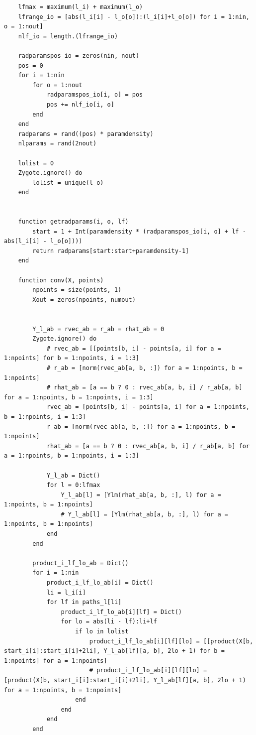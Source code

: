 \documentclass[book.tex]{subfiles}
\begin{document}
\begin{lstlisting}
    lfmax = maximum(l_i) + maximum(l_o)
    lfrange_io = [abs(l_i[i] - l_o[o]):(l_i[i]+l_o[o]) for i = 1:nin, o = 1:nout]
    nlf_io = length.(lfrange_io)

    radparamspos_io = zeros(nin, nout)
    pos = 0
    for i = 1:nin
        for o = 1:nout
            radparamspos_io[i, o] = pos
            pos += nlf_io[i, o]
        end
    end
    radparams = rand((pos) * paramdensity)
    nlparams = rand(2nout)

    lolist = 0
    Zygote.ignore() do
        lolist = unique(l_o)
    end


    function getradparams(i, o, lf)
        start = 1 + Int(paramdensity * (radparamspos_io[i, o] + lf - abs(l_i[i] - l_o[o])))
        return radparams[start:start+paramdensity-1]
    end

    function conv(X, points)
        npoints = size(points, 1)
        Xout = zeros(npoints, numout)


        Y_l_ab = rvec_ab = r_ab = rhat_ab = 0
        Zygote.ignore() do
            # rvec_ab = [[points[b, i] - points[a, i] for a = 1:npoints] for b = 1:npoints, i = 1:3]
            # r_ab = [norm(rvec_ab[a, b, :]) for a = 1:npoints, b = 1:npoints]
            # rhat_ab = [a == b ? 0 : rvec_ab[a, b, i] / r_ab[a, b] for a = 1:npoints, b = 1:npoints, i = 1:3]
            rvec_ab = [points[b, i] - points[a, i] for a = 1:npoints, b = 1:npoints, i = 1:3]
            r_ab = [norm(rvec_ab[a, b, :]) for a = 1:npoints, b = 1:npoints]
            rhat_ab = [a == b ? 0 : rvec_ab[a, b, i] / r_ab[a, b] for a = 1:npoints, b = 1:npoints, i = 1:3]

            Y_l_ab = Dict()
            for l = 0:lfmax
                Y_l_ab[l] = [Ylm(rhat_ab[a, b, :], l) for a = 1:npoints, b = 1:npoints]
                # Y_l_ab[l] = [Ylm(rhat_ab[a, b, :], l) for a = 1:npoints, b = 1:npoints]
            end
        end

        product_i_lf_lo_ab = Dict()
        for i = 1:nin
            product_i_lf_lo_ab[i] = Dict()
            li = l_i[i]
            for lf in paths_l[li]
                product_i_lf_lo_ab[i][lf] = Dict()
                for lo = abs(li - lf):li+lf
                    if lo in lolist
                        product_i_lf_lo_ab[i][lf][lo] = [[product(X[b, start_i[i]:start_i[i]+2li], Y_l_ab[lf][a, b], 2lo + 1) for b = 1:npoints] for a = 1:npoints]
                        # product_i_lf_lo_ab[i][lf][lo] = [product(X[b, start_i[i]:start_i[i]+2li], Y_l_ab[lf][a, b], 2lo + 1) for a = 1:npoints, b = 1:npoints]
                    end
                end
            end
        end


\end{lstlisting}
\end{document}
